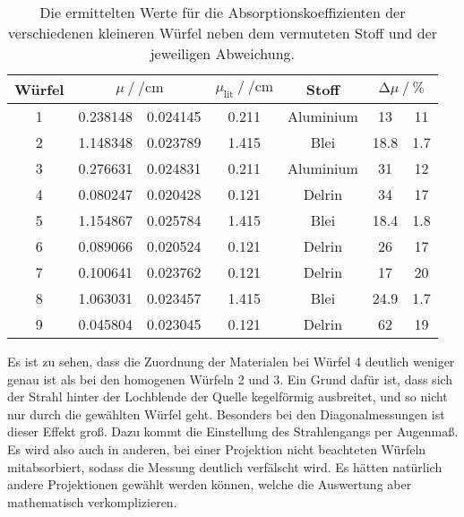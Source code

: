 \begin{table}[H]
    \centering
    \caption{Die ermittelten Werte für die Absorptionskoeffizienten der verschiedenen kleineren Würfel neben dem vermuteten Stoff und der jeweiligen Abweichung.}
    \label{tab:compare}
    \begin{tabular}{c S[table-format=1.6] @{${}\pm{}$} S[table-format=1.6] S[table-format=1.6] c S[table-format=2.1] @{${}\pm{}$} S[table-format=2.1]}
      \toprule
      {Würfel} &   & {$\mu_{\text{lit}} \mathbin{/} \si{\per\centi\metre}$} & {Stoff} &  \\
       & 0.238148 & 0.024145  & 0.211 & Aluminium  & 13    &11\\
      2 & 1.148348 & 0.023789  & 1.415 & Blei       & 18.8  & 1.7\\
      3 & 0.276631 & 0.024831  & 0.211 & Aluminium  & 31    &12\\
      4 & 0.080247 & 0.020428  & 0.121 & Delrin     & 34    &17\\
      5 & 1.154867 & 0.025784  & 1.415 & Blei       & 18.4  &1.8\\
      6 & 0.089066 & 0.020524  & 0.121 & Delrin     & 26    &17\\
      7 & 0.100641 & 0.023762  & 0.121 & Delrin     & 17    &20\\
      8 & 1.063031 & 0.023457  & 1.415 & Blei       & 24.9  &1.7\\
      9 & 0.045804 & 0.023045  & 0.121 & Delrin     & 62    &19\\
      \bottomrule
    \end{tabular}
  \end{table}

\noindent Es ist zu sehen, dass die Zuordnung der Materialen bei Würfel 4 deutlich weniger genau ist als bei den homogenen Würfeln 2 und 3. Ein Grund
dafür ist, dass sich der Strahl hinter der Lochblende der Quelle kegelförmig ausbreitet, und so nicht nur durch die gewählten Würfel geht. 
Besonders bei den Diagonalmessungen ist dieser Effekt groß. Dazu kommt die Einstellung des Strahlengangs per Augenmaß. Es wird also auch in anderen, 
bei einer Projektion nicht beachteten Würfeln mitabsorbiert, sodass die Messung deutlich verfälscht wird. Es hätten natürlich andere Projektionen gewählt 
werden können, welche die Auswertung aber mathematisch verkomplizieren. 